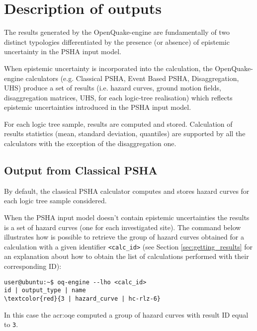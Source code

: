 \section{Description of outputs}
The results generated by the OpenQuake-engine are fundamentally 
of two distinct typologies differentiated by the presence (or 
absence) of epistemic uncertainty in the PSHA input model.

When epistemic uncertainty is incorporated into the 
calculation, the Open\-Quake\--engine calculators (e.g. Classical 
PSHA, Event Based PSHA, Disaggregation, UHS) produce a 
set of results (i.e. hazard curves, ground motion fields, 
disaggregation matrices, UHS, for each logic-tree realisation) 
which reflects epistemic 
uncertainties introduced in the PSHA input model.

For each logic tree sample, results are computed and stored. 
Calculation of results statistics (mean, standard deviation, 
quantiles) are supported by all the calculators with the exception 
of the disaggregation one.
\subsection{Output from Classical PSHA}
By default, the classical PSHA calculator computes and stores 
hazard curves for each logic tree sample considered.

When the PSHA input model doesn't contain epistemic uncertainties
the results is a set of hazard curves (one for each 
investigated site). 
The command below illustrates how is possible to retrieve the group
of hazard curves obtained for a calculation with a given
identifier \texttt{<calc\_id>} (see Section \ref{sec:getting_results}
for an explanation about how to obtain the list of calculations 
performed with their corresponding ID):
\begin{Verbatim}[frame=single, commandchars=\\\{\}, fontsize=\small]
user@ubuntu:~$ oq-engine --lho <calc_id>
id | output_type | name
\textcolor{red}{3 | hazard_curve | hc-rlz-6}
\end{Verbatim}
In this case the \gls{acr:oqe} computed a group of hazard curves with 
result ID equal to \texttt{3}.
 
